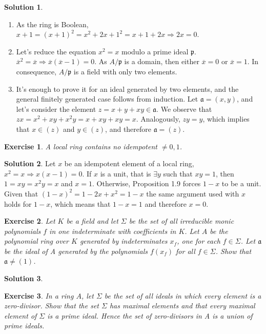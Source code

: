 \documentclass[12pt]{article}
\newcommand{\imp}{\ensuremath{\Rightarrow}}
\newcommand*\closure[1]{\overline{#1}}
\newtheorem{ex}{Exercise}[section]
\theoremstyle{definition}
\newtheorem*{sol}{Solution}
\begin{document}
\begin{sol}
	\begin{enumerate}[label=(\roman*)]
		\item As the ring is Boolean, $x+1 = (x+1)^2 = x^2 + 2x + 1^2 = x + 1 + 2x \imp 2x = 0$.
		\item Let's reduce the equation $x^2 = x$ modulo a prime ideal $\mathfrak{p}$. $\closure{x}^2 = \closure{x} \imp \closure{x}(\closure{x}-1) = 0$. As $A/\mathfrak{p}$ is a domain, then either $\closure{x} = 0$ or $\closure{x} = 1$. In consequence, $A/\mathfrak{p}$ is a field with only two elements.
		\item It's enough to prove it for an ideal generated by two elements, and the general finitely generated case follows from induction. Let $\mathfrak{a} = (x,y)$, and let's consider the element $z = x+y+xy \in \mathfrak{a}$. We observe that $zx = x^2 + xy + x^2y = x + xy + xy = x$. Analogously, $zy = y$, which implies that $x \in (z)$ and $y \in (z)$, and therefore $\mathfrak{a} = (z)$.
	\end{enumerate}
\end{sol}

\begin{ex}
	A local ring contains no idempotent $\neq 0, 1$.
\end{ex}

\begin{sol}
	Let $x$ be an idempotent element of a local ring, $x^2 = x \imp x(x-1) = 0$. If $x$ is a unit, that is $\exists y$ such that $xy = 1$, then $1 = xy = x^2y = x$ and $x = 1$. Otherwise, Proposition 1.9 forces $1-x$ to be a unit. Given that $(1-x)^2 = 1-2x+x^2 = 1-x$ the same argument used with $x$ holds for $1-x$, which means that $1-x = 1$ and therefore $x = 0$.
\end{sol}

\begin{ex}
	Let $K$ be a field and let $\Sigma$ be the set of all irreducible monic polynomials $f$ in one indeterminate with coefficients in $K$. Let $A$ be the polynomial ring over $K$ generated by indeterminates $x_f$, one for each $f \in \Sigma$. Let $\mathfrak{a}$ be the ideal of A generated by the polynomials $f(x_f)$ for all $f \in \Sigma$. Show that $\mathfrak{a} \neq (1)$.
\end{ex}

\begin{sol}
	
\end{sol}

\begin{ex}
	In a ring $A$, let $\Sigma$ be the set of all ideals in which every element is a zero-divisor. Show that the set $\Sigma$ has maximal elements and that every maximal element of $\Sigma$ is a prime ideal. Hence the set of zero-divisors in A is a union of prime ideals.
\end{ex}
\end{document}
